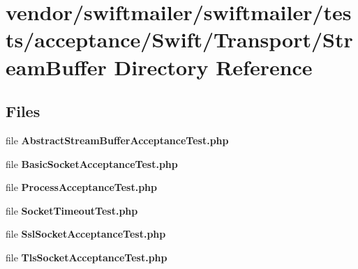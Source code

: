 \section{vendor/swiftmailer/swiftmailer/tests/acceptance/\+Swift/\+Transport/\+Stream\+Buffer Directory Reference}
\label{dir_43bd12179fa5ce5e619d4f8ea930ff1e}
\subsection*{Files}
\begin{DoxyCompactItemize}
\item 
file {\bf Abstract\+Stream\+Buffer\+Acceptance\+Test.\+php}
\item 
file {\bf Basic\+Socket\+Acceptance\+Test.\+php}
\item 
file {\bf Process\+Acceptance\+Test.\+php}
\item 
file {\bf Socket\+Timeout\+Test.\+php}
\item 
file {\bf Ssl\+Socket\+Acceptance\+Test.\+php}
\item 
file {\bf Tls\+Socket\+Acceptance\+Test.\+php}
\end{DoxyCompactItemize}
